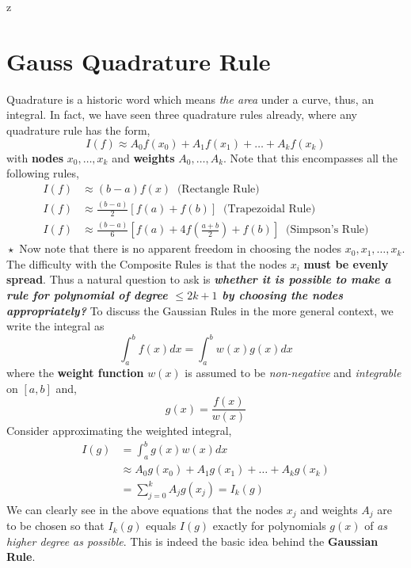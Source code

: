 z\documentclass[a4paper,12pt,twoside]{book}
\newcommand{\nll}[0]{\newline\newline}
\newcommand{\tit}[1]{\textit{#1}}
\begin{document}
\section{Gauss Quadrature Rule}
Quadrature is a historic word which means \textit{the area} under a curve, thus, an integral. In fact, we have seen three quadrature rules already, where any quadrature rule has the form,
\begin{equation}
    I(f) \approx A_0 f(x_0) + A_1f(x_1) + \dots + A_k f(x_k)
\end{equation}
with \textbf{nodes} $x_0,\dots,x_k$ and \textbf{weights} $A_0,\dots,A_k$.
\nll
Note that this encompasses all the following rules,
\begin{equation*}
    \begin{split}
    I(f) &\approx (b-a)f(x)\;\;\text{(Rectangle Rule)}\\
    I(f) &\approx \frac{(b-a)}{2} [f(a) + f(b)]\;\;\text{(Trapezoidal Rule)}\\
    I(f) &\approx \frac{(b-a)}{6} \left[ f(a) + 4f\left( \frac{a+b}{2} \right)  + f(b)\right]\;\;\text{(Simpson's Rule)}
    \end{split}
\end{equation*}
$\boxed{\star}$ Now note that there is no apparent freedom in choosing the nodes $x_0,x_1,\dots,x_k$. The difficulty with the Composite Rules is that the nodes $x_i$ \textbf{must be evenly spread}.
\nll
Thus a natural question to ask is \textit{\textbf{whether it is possible to make a rule for polynomial of degree $\le 2k+1$ by choosing the nodes appropriately?}}
\nll
To discuss the Gaussian Rules in the more general context, we write the integral as
\[\int_a^b f(x)dx = \int_a^b w(x)g(x)dx\]
where the \textbf{weight function} $w(x)$ is assumed to be \tit{non-negative} and \tit{integrable} on $[a,b]$ and,
\[ g(x) = \frac{f(x)}{w(x)} \]
Consider approximating the weighted integral,
\begin{equation*}
\begin{split}
    I(g) &= \int_a^b g(x)w(x) dx\\
    &\approx A_0g(x_0) + A_1g(x_1) + \dots + A_kg(x_k)\\
    &= \sum_{j=0}^k A_j g(x_j) = I_k(g)
\end{split}
\end{equation*}
We can clearly see in the above equations that the nodes $x_j$ and weights $A_j$ are to be chosen so that $I_k(g)$ equals $I(g)$ exactly for polynomials $g(x)$ of \textit{as higher degree as possible}. This is indeed the basic idea behind the \textbf{Gaussian Rule}.
\end{document}
